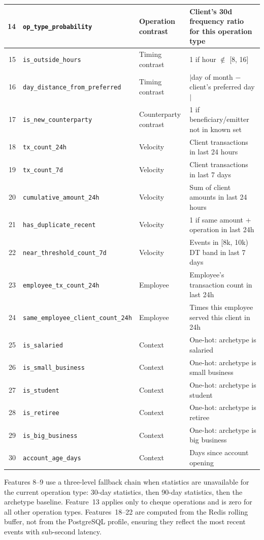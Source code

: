 \begin{longtable}{@{}rllp{6.5cm}@{}}
14 & \texttt{op\_type\_probability}      & Operation contrast & Client's 30d frequency ratio for this operation type \\
\midrule

15 & \texttt{is\_outside\_hours}         & Timing contrast & 1 if hour $\notin$ [8, 16] \\
16 & \texttt{day\_distance\_from\_preferred} & Timing contrast & $|$day of month $-$ client's preferred day$|$ \\
\midrule

17 & \texttt{is\_new\_counterparty}      & Counterparty contrast & 1 if beneficiary/emitter not in known set \\
\midrule

18 & \texttt{tx\_count\_24h}             & Velocity & Client transactions in last 24 hours \\
19 & \texttt{tx\_count\_7d}              & Velocity & Client transactions in last 7 days \\
20 & \texttt{cumulative\_amount\_24h}    & Velocity & Sum of client amounts in last 24 hours \\
21 & \texttt{has\_duplicate\_recent}     & Velocity & 1 if same amount + operation in last 24h \\
22 & \texttt{near\_threshold\_count\_7d} & Velocity & Events in [8k, 10k) DT band in last 7 days \\
\midrule

23 & \texttt{employee\_tx\_count\_24h}          & Employee & Employee's transaction count in last 24h \\
24 & \texttt{same\_employee\_client\_count\_24h} & Employee & Times this employee served this client in 24h \\
\midrule

25 & \texttt{is\_salaried}               & Context & One-hot: archetype is salaried \\
26 & \texttt{is\_small\_business}        & Context & One-hot: archetype is small business \\
27 & \texttt{is\_student}                & Context & One-hot: archetype is student \\
28 & \texttt{is\_retiree}                & Context & One-hot: archetype is retiree \\
29 & \texttt{is\_big\_business}          & Context & One-hot: archetype is big business \\
30 & \texttt{account\_age\_days}         & Context & Days since account opening \\

\end{longtable}

Features 8--9 use a three-level fallback chain when statistics are
unavailable for the current operation type: 30-day statistics, then
90-day statistics, then the archetype baseline. Feature~13 applies only
to cheque operations and is zero for all other operation types.
Features~18--22 are computed from the Redis rolling buffer, not from the
PostgreSQL profile, ensuring they reflect the most recent events with
sub-second latency.